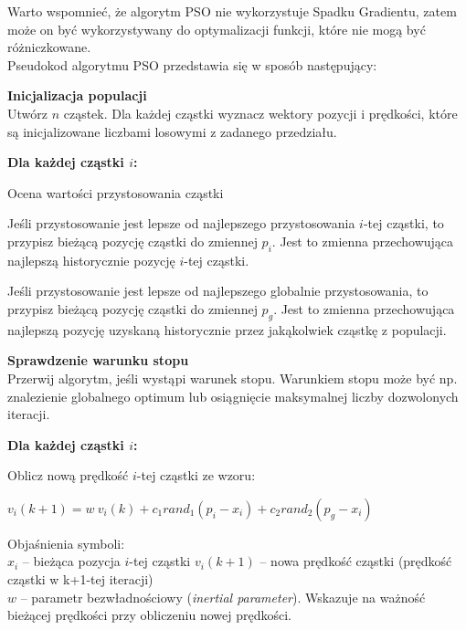 Warto wspomnieć, że algorytm PSO nie wykorzystuje Spadku Gradientu, zatem może on być wykorzystywany do optymalizacji funkcji, które nie mogą być różniczkowane. \\
\newpage
Pseudokod algorytmu PSO przedstawia się w sposób następujący:
\begin{enumerate*}
\item \textbf{Inicjalizacja populacji} \\
Utwórz $n$ cząstek. Dla każdej cząstki wyznacz wektory pozycji i prędkości, które są inicjalizowane liczbami losowymi z zadanego przedziału.
\item \textbf{Dla każdej cząstki $i$:}
\begin{enumerate*}
\item Ocena wartości przystosowania cząstki
\item Jeśli przystosowanie jest lepsze od najlepszego przystosowania $i$-tej cząstki, to przypisz bieżącą pozycję cząstki do zmiennej $p_i$. Jest to zmienna przechowująca najlepszą historycznie pozycję $i$-tej cząstki.
\item Jeśli przystosowanie jest lepsze od najlepszego globalnie przystosowania, to przypisz bieżącą pozycję cząstki do zmiennej $p_g$. Jest to zmienna przechowująca najlepszą pozycję uzyskaną historycznie przez jakąkolwiek cząstkę z populacji.
\end{enumerate*}
\item \textbf{Sprawdzenie warunku stopu} \\
Przerwij algorytm, jeśli wystąpi warunek stopu. Warunkiem stopu może być np. znalezienie globalnego optimum lub osiągnięcie maksymalnej liczby dozwolonych iteracji.
\item \textbf{Dla każdej cząstki $i$:}
\begin{enumerate*}
\item Oblicz nową prędkość $i$-tej cząstki ze wzoru: \\
\begin{center}
\begin{Large}
$v_i(k+1) = w\ v_i(k) + c_1rand_1(p_i - x_i) + c_2rand_2(p_g - x_i)$
\end{Large}
\end{center}
\vspace{0.5cm}
Objaśnienia symboli: \\
$x_i$ -- bieżąca pozycja $i$-tej cząstki
$v_i(k+1)$ -- nowa prędkość cząstki (prędkość cząstki w k+1-tej iteracji) \\
$w$ -- parametr bezwładnościowy (\textit{inertial parameter}). Wskazuje na ważność bieżącej prędkości przy obliczeniu nowej prędkości. \\

\end{enumerate*}
\end{enumerate*}

